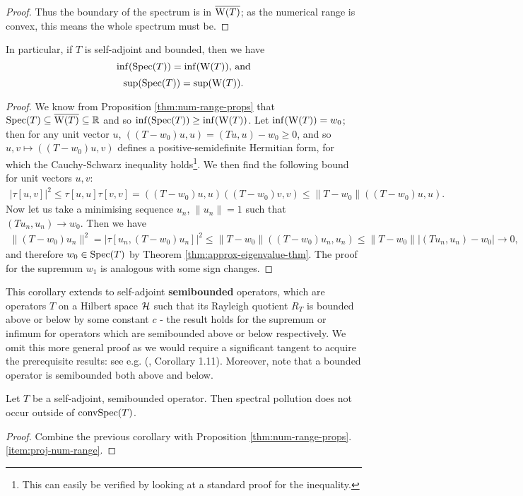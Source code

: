 \documentclass[../main.tex]{subfiles}
\begin{document}
\begin{proof}
Thus the boundary of the spectrum is in $\overline{\mathrm{W}(T)}$; as the numerical range is convex,
this means the whole spectrum must be. 
\end{proof}

\begin{corollary}\label{thm:self-adj-num-range}
In particular, if $T$ is self-adjoint and bounded, then we have
$$\inf(\mathrm{Spec}(T)) = \inf(\mathrm{W}(T))\text{, and}$$
$$\sup(\mathrm{Spec}(T)) = \sup(\mathrm{W}(T)).$$
\end{corollary}
\begin{proof}
We know from Proposition \ref{thm:num-range-props} that $\mathrm{Spec}(T) \subseteq \overline{\mathrm{W}(T)} \subseteq \mathbb{R}$ and so $\inf(\mathrm{Spec}(T)) \geq \inf(\mathrm{W}(T))$. Let $\inf(\mathrm{W}(T)) = w_0$; then for any unit vector $u$, $((T - w_0)u, u)  = (Tu, u) - w_0 \geq 0$, and so $u, v \mapsto ((T - w_0)u, v)$ defines a positive-semidefinite Hermitian form, for which the Cauchy-Schwarz inequality holds\footnote{This can easily be verified by looking at a standard proof for the inequality.}. We then find the following bound for unit vectors $u, v$:
\begin{align*}
|\tau[u,v]|^2 \leq \tau[u, u] \tau[v, v] = ((T - w_0)u, u)((T - w_0)v, v) \leq \|T - w_0\|((T - w_0)u, u).
\end{align*}
Now let us take a minimising sequence $u_n$, $\|u_n\| = 1$ such that $(Tu_n, u_n) \rightarrow w_0$. Then we have
\begin{align*}
\|(T - w_0)u_n\|^2 = |\tau[u_n, (T - w_0)u_n]|^2  \leq \|T - w_0\|((T - w_0)u_n, u_n) \leq \|T - w_0\||(Tu_n, u_n) - w_0| \rightarrow 0,
\end{align*}
and therefore $w_0 \in \mathrm{Spec}(T)$ by Theorem \ref{thm:approx-eigenvalue-thm}.
The proof for the supremum $w_1$ is analogous with some sign changes.
\end{proof}
This corollary extends to self-adjoint \textbf{semibounded} operators, which are operators $T$ on a Hilbert space $\mathcal{H}$ such that its Rayleigh quotient $R_T$ is bounded above or below by some constant $c$ - the result holds for the supremum or infimum for operators which are semibounded above or below respectively. We omit this more general proof as we would require a significant tangent to acquire the prerequisite results: see e.g. (\cite{frank2022schrodinger}, Corollary 1.11). Moreover, note that a bounded operator is semibounded both above and below.

\begin{corollary}
Let $T$ be a self-adjoint, semibounded operator. Then spectral pollution does not occur outside of $\mathrm{conv}\mathrm{Spec}(T)$.
\end{corollary}
\begin{proof}
Combine the previous corollary with Proposition \ref{thm:num-range-props}.\ref{item:proj-num-range}.
\end{proof}
\end{document}
